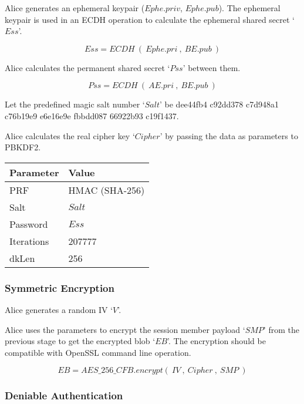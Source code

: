 \documentclass[a4paper,11pt]{article}
\begin{document}
Alice generates an ephemeral keypair ($Ephe.priv$, $Ephe.pub$).
The ephemeral keypair is used in an ECDH operation to calculate the ephemeral shared secret `$Ess$'.

\begin{displaymath}
	Ess = ECDH~(~Ephe.pri~,~BE.pub~)
\end{displaymath}

Alice calculates the permanent shared secret `$Pss$' between them.

\begin{displaymath}
	Pss = ECDH~(~AE.pri~,~BE.pub~)
\end{displaymath}

Let the predefined magic salt number `$Salt$' be dee44fb4 c92dd378 c7d948a1 c76b19e9 e6e16e9e fbbdd087 66922b93 c19f1437.

Alice calculates the real cipher key `$Cipher$' by passing the data as parameters to PBKDF2.

\begin{center}
	\begin{tabu}{ll}
		\toprule
		Parameter  & Value          \\
		\midrule
		PRF        & HMAC (SHA-256) \\
		Salt       & $Salt$         \\
		Password   & $Ess$          \\
		Iterations & 207777         \\
		dkLen      & 256            \\
		\bottomrule
	\end{tabu}
\end{center}

\subsubsection{Symmetric Encryption}

Alice generates a random IV `$V$'.

Alice uses the parameters to encrypt the session member payload `$SMP$' from the previous stage to get the encrypted blob `$EB$'.
The encryption should be compatible with OpenSSL command line operation.

\begin{displaymath}
	EB = AES\_256\_CFB.encrypt(~IV~,~Cipher~,~SMP~)
\end{displaymath}

\subsubsection{Deniable Authentication}
\end{document}
